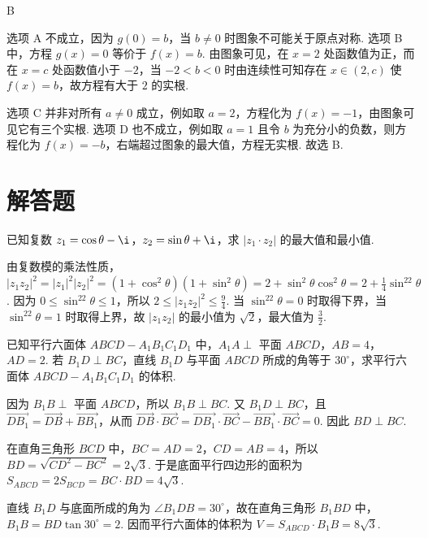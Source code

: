 \begin{answer}
B
\end{answer}

\begin{solution}
选项 A 不成立，因为 \(g(0)=b\)，当 \(b\ne0\) 时图象不可能关于原点对称. 选项 B 中，方程 \(g(x)=0\) 等价于 \(f(x)=b\). 由图象可见，在 \(x=2\) 处函数值为正，而在 \(x=c\) 处函数值小于 \(-2\)，当 \(-2<b<0\) 时由连续性可知存在 \(x\in(2,c)\) 使 \(f(x)=b\)，故方程有大于 \(2\) 的实根.

选项 C 并非对所有 \(a\ne0\) 成立，例如取 \(a=2\)，方程化为 \(f(x)=-1\)，由图象可见它有三个实根. 选项 D 也不成立，例如取 \(a=1\) 且令 \(b\) 为充分小的负数，则方程化为 \(f(x)=-b\)，右端超过图象的最大值，方程无实根. 故选 B.
\end{solution}

\section{解答题}
\begin{problem}
已知复数 \( z_{1} = \cos \theta - \i \)，\( z_{2} = \sin \theta + \i \)，求 \( |z_{1} \cdot z_{2}| \) 的最大值和最小值.
\end{problem}

\begin{solution}
由复数模的乘法性质，
\(|z_1z_2|^2=|z_1|^2|z_2|^2=(1+\cos^2\theta)(1+\sin^2\theta)=2+\sin^2\theta\cos^2\theta=2+\frac{1}{4}\sin^22\theta\).
因为 \(0\leq\sin^22\theta\leq1\)，所以 \(2\leq|z_1z_2|^2\leq\frac{9}{4}\). 当 \(\sin^22\theta=0\) 时取得下界，当 \(\sin^22\theta=1\) 时取得上界，故 \(|z_1z_2|\) 的最小值为 \(\sqrt{2}\)，最大值为 \(\frac{3}{2}\).
\end{solution}

\begin{problem}
已知平行六面体 \(ABCD - A_{1}B_{1}C_{1}D_{1}\) 中，\(A_{1}A \perp\) 平面 \(ABCD\)，\(AB = 4\)，\(AD = 2\). 若 \(B_{1}D \perp BC\)，直线 \(B_{1}D\) 与平面 \(ABCD\) 所成的角等于 \(30^{\circ}\)，求平行六面体 \(ABCD - A_{1}B_{1}C_{1}D_{1}\) 的体积.

\end{problem}

\begin{solution}
因为 \(B_1B\perp\) 平面 \(ABCD\)，所以 \(B_1B\perp BC\). 又 \(B_1D\perp BC\)，且 \(\overrightarrow{DB_1}=\overrightarrow{DB}+\overrightarrow{BB_1}\)，从而
\(\overrightarrow{DB}\mathbin{\cdot}\overrightarrow{BC}=\overrightarrow{DB_1}\mathbin{\cdot}\overrightarrow{BC}-\overrightarrow{BB_1}\mathbin{\cdot}\overrightarrow{BC}=0\). 因此 \(BD\perp BC\).

在直角三角形 \(BCD\) 中，\(BC=AD=2\)，\(CD=AB=4\)，所以 \(BD=\sqrt{CD^2-BC^2}=2\sqrt{3}\). 于是底面平行四边形的面积为 \(S_{ABCD}=2S_{BCD}=BC\cdot BD=4\sqrt{3}\).

直线 \(B_1D\) 与底面所成的角为 \(\angle B_1DB=30^{\circ}\)，故在直角三角形 \(B_1BD\) 中，\(B_1B=BD\tan30^{\circ}=2\). 因而平行六面体的体积为 \(V=S_{ABCD}\cdot B_1B=8\sqrt{3}\).
\end{solution}

